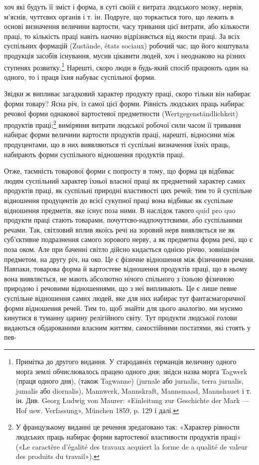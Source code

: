 хоч які будуть її зміст і форма, в суті своїй є витрата людського
мозку, нервів, м’яснів, чуттєвих органів і т. ін. Подруге, що торкається
того, що лежить в основі визначення величини вартости,
часу тривання цієї витрати, або кількости праці, то кількість
праці навіть наочно відрізняється від якости праці. За всіх суспільних
формацій (Zustände, états sociaux) робочий час, що його
коштувала продукція засобів існування, мусив цікавити людей,
хоч і неоднаково на різних ступенях розвитку.\footnote{
Примітка до другого видання. У стародавніх германців величину
одного морґа землі обчислювалось працею одного дня; звідси назва морга
Tagwerk (праця одного дня), (також Tagwanne) (jurnale або jurnalis,
terra jurnalis, jumalis або diornalis), Mannwerk, Mannskraft, Mannsmaad,
Mannshauet і т. ін. Див. Georg Ludwig von Maurer: «Einleitung zur Geschichte
der Mark — Hof usw. Verfassung», München 1859, p. 129 і далі.
} Нарешті, скоро
люди в будь-який спосіб працюють один на одного, то і праця
їхня набуває суспільної форми.

Звідки ж випливає загадковий характер продукту праці,
скоро тільки він набирає форми товару? Ясна річ, із самої цієї
форми. Рівність людських праць набирає речової форми однакової
вартостевої предметности (Wertgegenständlichkeit) продуктів
праці;\footnote*{
У французькому виданні це речення зредаґовано так: «Характер
рівности людських праць набирає форми вартостевої властивости продуктів
праці» («Le caractère d’égalité des travaux acquiert la forme de
a qualité de valeur des produits du travail»).
} виміряння витрати людської робочої сили часом її тривання
набирає форми величини вартости продуктів праці, нарешті,
відносини між продуцентами, що в них виявляються ті
суспільні визначення їхніх праць, набирають форми суспільного
відношення продуктів праці.

Отже, таємність товарової форми є попросту в тому, що форма
ця відбиває людям суспільний характер їхньої власної праці як
предметний характер самих продуктів праці, як суспільні природні
властивості цих речей; тим то й суспільне відношення продуцентів
до всієї сукупної праці вона відбиває як суспільне відношення
предметів, яке існує поза ними. В наслідок такого quid
pro quo продукти праці стають товарами, почуттєво-надпочуттєвими,
або суспільними речами. Так, світловий вплив якоїсь речі
на зоровий нерв виявляється не як суб’єктивне подразнення самого
зорового нерву, а як предметна форма речі, що є поза оком.
Але при баченні світло дійсно кидається однією річчю, зовнішнім
предметом, на другу річ, на око. Це є фізичне відношення між
фізичними речами. Навпаки, товарова форма й вартостеве відношення
продуктів праці, що в ньому вона виявляється, не мають
абсолютно нічого спільного з їхньою фізичною природою і речовими
відношеннями, що з неї випливають. Це є лише певне суспільне
відношення самих людей, яке для них набирає тут фантасмагоричної
форми відношення речей. Тим то, щоб знайти для
цього аналогію, ми мусимо кинутися в туманну царину релігійного
світу. Тут продукти людської голови видаються обдарованими
власним життям, самостійними постатями, які стоять у пев-